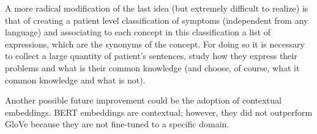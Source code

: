 A more radical modification of the last idea (but extremely difficult to realize) is that of creating a patient level classification of symptoms (independent from any language) and associating to each concept in this classification a list of expressions, which are the synonyms of the concept. For doing so it is necessary to collect a large quantity of patient's sentences, study how they express their problems and what is their common knowledge (and choose, of course, what it common knowledge and what is not).

Another possible future improvement could be the adoption of contextual embeddings. BERT embeddings are contextual; however, they did not outperform GloVe because they are not fine-tuned to a specific domain.



